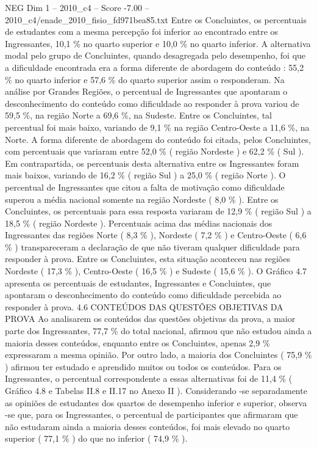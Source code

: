 \begin{textsample}{NEG Dim 1 – 2010\_c4 – Score -7.00 – 2010\_c4/enade\_2010\_fisio\_fd971bea85.txt}
Entre os Concluintes, os percentuais de estudantes com a mesma percepção foi inferior ao encontrado entre os Ingressantes, 10,1 \% no quarto superior e 10,0 \% no quarto inferior.
A alternativa modal pelo grupo de Concluintes, quando desagregada pelo desempenho, foi que a dificuldade encontrada era a forma diferente de abordagem do conteúdo : 55,2 \% no quarto inferior e 57,6 \% do quarto superior assim o responderam.
Na análise por Grandes Regiões, o percentual de Ingressantes que apontaram o desconhecimento do conteúdo como dificuldade ao responder à prova variou de 59,5 \%, na região Norte a 69,6 \%, na Sudeste.
Entre os Concluintes, tal percentual foi mais baixo, variando de 9,1 \% na região Centro-Oeste a 11,6 \%, na Norte.
A forma diferente de abordagem do conteúdo foi citada, pelos Concluintes, com percentuais que variaram entre 52,0 \% ( região Nordeste ) e 62,2 \% ( Sul ).
Em contrapartida, os percentuais desta alternativa entre os Ingressantes foram mais baixos, variando de 16,2 \% ( região Sul ) a 25,0 \% ( região Norte ).
O percentual de Ingressantes que citou a falta de motivação como dificuldade superou a média nacional somente na região Nordeste ( 8,0 \% ).
Entre os Concluintes, os percentuais para essa resposta variaram de 12,9 \% ( região Sul ) a 18,5 \% ( região Nordeste ).
Percentuais acima das médias nacionais dos Ingressantes das regiões Norte ( 8,3 \% ), Nordeste ( 7,2 \% ) e Centro-Oeste ( 6,6 \% ) transpareceram a declaração de que não tiveram qualquer dificuldade para responder à prova.
Entre os Concluintes, esta situação aconteceu nas regiões Nordeste ( 17,3 \% ), Centro-Oeste ( 16,5 \% ) e Sudeste ( 15,6 \% ).
O Gráfico 4.7 apresenta os percentuais de estudantes, Ingressantes e Concluintes, que apontaram o desconhecimento do conteúdo como dificuldade percebida ao responder à prova. 4.6 CONTEÚDOS DAS QUESTÕES OBJETIVAS DA PROVA Ao analisarem os conteúdos das questões objetivas da prova, a maior parte dos Ingressantes, 77,7 \% do total nacional, afirmou que não estudou ainda a maioria desses conteúdos, enquanto entre os Concluintes, apenas 2,9 \% expressaram a mesma opinião.
Por outro lado, a maioria dos Concluintes ( 75,9 \% ) afirmou ter estudado e aprendido muitos ou todos os conteúdos.
Para os Ingressantes, o percentual correspondente a essas alternativas foi de 11,4 \% ( Gráfico 4.8 e Tabelas II.8 e II.17 no Anexo II ).
Considerando -se separadamente as opiniões de estudantes dos quartos de desempenho inferior e superior, observa -se que, para os Ingressantes, o percentual de participantes que afirmaram que não estudaram ainda a maioria desses conteúdos, foi mais elevado no quarto superior ( 77,1 \% ) do que no inferior ( 74,9 \% ).

\end{textsample}
